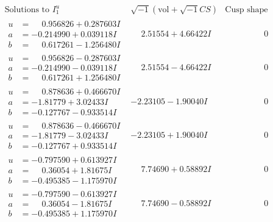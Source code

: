 \documentclass[1p]{elsarticle_modified}
\theoremstyle{definition}
\newcommand{\I}{\sqrt{-1}}
\begin{document}
$$\begin{array}{c|c|c}  
\text{Solutions to }I^u_{1}& \I (\text{vol} + \sqrt{-1}CS) & \text{Cusp shape}\\
 \hline 
\begin{aligned}
u &= \phantom{-}0.956826 + 0.287603 I \\
a &= -0.214990 + 0.039118 I \\
b &= \phantom{-}0.617261 - 1.256480 I\end{aligned}
 & \phantom{-}2.51554 + 4.66422 I & \phantom{-0.000000 } 0 \\ \hline\begin{aligned}
u &= \phantom{-}0.956826 - 0.287603 I \\
a &= -0.214990 - 0.039118 I \\
b &= \phantom{-}0.617261 + 1.256480 I\end{aligned}
 & \phantom{-}2.51554 - 4.66422 I & \phantom{-0.000000 } 0 \\ \hline\begin{aligned}
u &= \phantom{-}0.878636 + 0.466670 I \\
a &= -1.81779 + 3.02433 I \\
b &= -0.127767 - 0.933514 I\end{aligned}
 & -2.23105 - 1.90040 I & \phantom{-0.000000 } 0 \\ \hline\begin{aligned}
u &= \phantom{-}0.878636 - 0.466670 I \\
a &= -1.81779 - 3.02433 I \\
b &= -0.127767 + 0.933514 I\end{aligned}
 & -2.23105 + 1.90040 I & \phantom{-0.000000 } 0 \\ \hline\begin{aligned}
u &= -0.797590 + 0.613927 I \\
a &= \phantom{-}0.36054 + 1.81675 I \\
b &= -0.495385 - 1.175970 I\end{aligned}
 & \phantom{-}7.74690 + 0.58892 I & \phantom{-0.000000 } 0 \\ \hline\begin{aligned}
u &= -0.797590 - 0.613927 I \\
a &= \phantom{-}0.36054 - 1.81675 I \\
b &= -0.495385 + 1.175970 I\end{aligned}
 & \phantom{-}7.74690 - 0.58892 I & \phantom{-0.000000 } 0 \\ \hline\begin{aligned}

\end{aligned}
\end{array}$$
\end{document}
